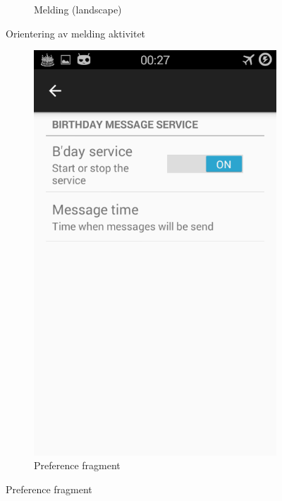 \begin{figure}[ht]
\begin{subfigure}[b]{0.6\textwidth}
        \caption{Melding (landscape)}
        \label{fig:melding_l}
    \end{subfigure}
    \caption{Orientering av melding aktivitet}
    \label{fig:melding_aktivitet}
\end{figure}

\begin{figure}[ht]
    \centering
    \begin{subfigure}[b]{0.35\textwidth}
        \includegraphics[width=\textwidth]{./img/7.png}
        \caption{Preference fragment}
        \label{fig:preferance_fragment}
    \end{subfigure}

\end{figure}
